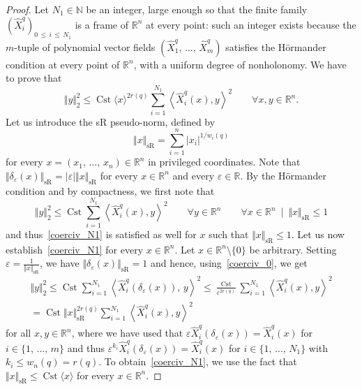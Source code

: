 \documentclass[AHL,Unicode,published]{cedram}
\newcommand*\R{\mathbb{R}}
\newcommand*\N{\mathbb{N}}
\DeclareMathOperator{\Cst}{Cst}
\DeclareMathOperator{\sR}{sR}
\renewcommand{\leq}{\leqslant}
\let\oldforall\forall
\renewcommand*{\forall}{\mathrel{\oldforall}}
\begin{document}
\begin{proof}
Let $N_1\in\N$ be an integer, large enough so that the finite family $(\widehat{X}_i^{q})_{0\,\leq\,i\,\leq\,N_1}$ is a frame of $\R^n$ at every point: such an integer exists because the $m$-tuple of polynomial vector fields $(\widehat{X}_1^{q},\,\ldots,\,\widehat{X}_m^{q})$ satisfies the H\"ormander condition at every point of $\R^n$, with a uniform degree of nonholonomy. We have to prove that
\begin{equation}\label{coerciv_N1}
\Vert y\Vert_2^2\leq\Cst\langle x\rangle^{2r(q)}\sum_{i=1}^{N_1} \left\langle \widehat{X}^{q}_i(x),y\right\rangle^2
\qquad \forall x,y\in\R^n.
\end{equation}
Let us introduce the sR pseudo-norm, defined by
\[
\Vert x\Vert_{\sR} = \sum_{i=1}^n \vert x_i\vert^{1/w_i(q)}
\]
for every $x=(x_1,\,\ldots,\,x_n)\in\R^n$ in privileged coordinates. Note that $\Vert\delta_\varepsilon(x)\Vert_{\sR}=\vert\varepsilon\vert\Vert x\Vert_{\sR}$ for every $x\in\R^n$ and every $\varepsilon\in\R$. By the H\"ormander condition and by compactness, we first note that
\begin{equation}\label{coerciv_0}
\Vert y\Vert_2^2\leq\Cst\sum_{i=1}^{N_1} \left\langle \widehat{X}^{q}_i(x),y\right\rangle^2
\qquad \forall y\in\R^n\qquad\forall x\in\R^n\ \mid\ \Vert x\Vert_{\sR}\leq 1
\end{equation}
and thus~\eqref{coerciv_N1} is satisfied as well for $x$ such that $\Vert x\Vert_{\sR}\leq 1$. Let us now establish~\eqref{coerciv_N1} for every $x\in\R^n$. Let $x\in\R^n\setminus\{0\}$ be arbitrary. Setting $\varepsilon=\frac{1}{\Vert x\Vert_{\sR}}$, we have $\Vert\delta_\varepsilon(x)\Vert_{\sR}=1$ and hence, using~\eqref{coerciv_0}, we get
\begin{multline*}
\Vert y\Vert_2^2\leq\Cst\sum_{i=1}^{N_1} \left\langle \widehat{X}^{q}_i(\delta_\varepsilon(x)),\,y\right\rangle^2
\leq \frac{\Cst}{\varepsilon^{2r(q)}} \sum_{i=1}^{N_1} \left\langle \widehat{X}^{q}_i(x),y\right\rangle^2 \\
= \Cst\Vert x\Vert_{\sR}^{2r(q)} \sum_{i=1}^{N_1} \left\langle \widehat{X}^{q}_i(x),y\right\rangle^2
\end{multline*}
for all $x,y\in\R^n$, where we have used that $\varepsilon\widehat{X}^{q}_i(\delta_\varepsilon(x))=\widehat{X}^{q}_i(x)$ for $i\in\{1,\,\ldots,\,m\}$ and thus $\varepsilon^{k_i}\widehat{X}^{q}_i(\delta_\varepsilon(x))=\widehat{X}^{q}_i(x)$ for $i\in\{1,\,\ldots,\,N_1\}$ with $k_i\leq w_n(q)=r(q)$. To obtain~\eqref{coerciv_N1}, we use the fact that $\Vert x\Vert_{\sR}\leq\Cst\langle x\rangle$ for every $x\in\R^n$.
\goodbreak


\end{proof}
\end{document}
